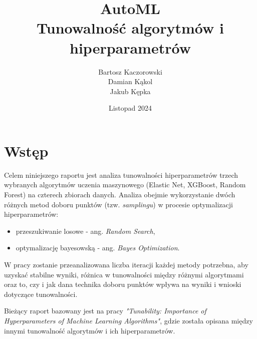 \documentclass[a4paper,11pt]{article}
\title{\vspace{5ex}\Huge\textbf{AutoML} \\ 
\LARGE{\vspace{2ex}Tunowalność algorytmów i hiperparametrów}\vspace{10ex}}
\author{
		Bartosz Kaczorowski \vspace{1ex}\\
        Damian Kąkol \vspace{1ex}\\
        Jakub Kępka 
        \vspace{3ex}
}
\date{\vspace{50ex} Listopad 2024}
\begin{document}
\doublespacing{}

\clearpage\maketitle
\thispagestyle{empty}

\pagestyle{fancy}
\fancyhf{}
\fancyfoot[r]{\thepage}
\footskip=30pt

\renewcommand{\footruleskip}{10pt}
\renewcommand{\headrulewidth}{0pt}
\renewcommand{\footrulewidth}{1pt}

\newpage
\tableofcontents
\onehalfspacing{}

\newpage
\section{Wstęp}
Celem niniejszego raportu jest analiza tunowalności hiperparametrów trzech wybranych algorytmów uczenia maszynowego (Elastic Net, XGBoost, Random Forest) na czterech zbiorach danych. Analiza obejmie wykorzystanie dwóch różnych metod doboru punktów (tzw. \textit{samplingu}) w procesie optymalizacji hiperparametrów:
\begin{itemize}
    \item przeszukiwanie losowe - ang. \textit{Random Search}\cite{RS},
    \item optymalizację bayesowską - ang. \textit{Bayes Optimization}\cite{BS}.
\end{itemize}

W pracy zostanie przeanalizowana liczba iteracji każdej metody potrzebna, aby uzyskać stabilne wyniki, różnica w tunowalności między różnymi algorytmami oraz to, czy i jak dana technika doboru punktów wpływa na wyniki i wnioski dotyczące tunowalności.

Bieżący raport bazowany jest na pracy \textit{"Tunability: Importance of Hyperparameters of Machine Learning Algorithms"}\cite{tuna}, gdzie została opisana między innymi tunowalność algorytmów i ich hiperparametrów.
\end{document}
